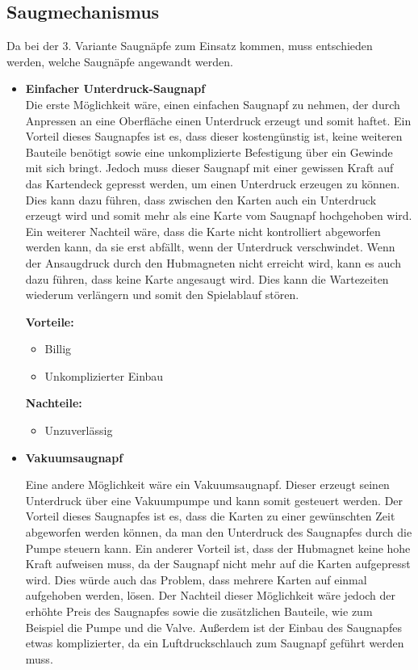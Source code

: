 \subsection{Saugmechanismus}

Da bei der 3. Variante Saugnäpfe zum Einsatz kommen, muss entschieden werden, welche Saugnäpfe angewandt werden.

\begin{itemize}
    \item \textbf{Einfacher Unterdruck-Saugnapf} \\
    Die erste Möglichkeit wäre, einen einfachen Saugnapf zu nehmen, der durch Anpressen an eine Oberfläche einen Unterdruck erzeugt und somit haftet.
    Ein Vorteil dieses Saugnapfes ist es, dass dieser kostengünstig ist, keine weiteren Bauteile benötigt sowie eine unkomplizierte Befestigung über ein Gewinde mit sich bringt.
    Jedoch muss dieser Saugnapf mit einer gewissen Kraft auf das Kartendeck gepresst werden, um einen Unterdruck erzeugen zu können.
    Dies kann dazu führen, dass zwischen den Karten auch ein Unterdruck erzeugt wird und somit mehr als eine Karte vom Saugnapf hochgehoben wird.
    Ein weiterer Nachteil wäre, dass die Karte nicht kontrolliert abgeworfen werden kann, da sie erst abfällt, wenn der Unterdruck verschwindet.
    Wenn der Ansaugdruck durch den Hubmagneten nicht erreicht wird, kann es auch dazu führen, dass keine Karte angesaugt wird.
    Dies kann die Wartezeiten wiederum verlängern und somit den Spielablauf stören.

    \textbf{Vorteile:}
    \begin{itemize}
        \item Billig
        \item Unkomplizierter Einbau
    \end{itemize}
    \textbf{Nachteile:}
    \begin{itemize}
        \item Unzuverlässig
    \end{itemize}

    \item \textbf{Vakuumsaugnapf}

    Eine andere Möglichkeit wäre ein Vakuumsaugnapf.
    Dieser erzeugt seinen Unterdruck über eine Vakuumpumpe und kann somit gesteuert werden.
    Der Vorteil dieses Saugnapfes ist es, dass die Karten zu einer gewünschten Zeit abgeworfen werden können, da man den Unterdruck des Saugnapfes durch die Pumpe steuern kann.
    Ein anderer Vorteil ist, dass der Hubmagnet keine hohe Kraft aufweisen muss, da der Saugnapf nicht mehr auf die Karten aufgepresst wird.
    Dies würde auch das Problem, dass mehrere Karten auf einmal aufgehoben werden, lösen.
    Der Nachteil dieser Möglichkeit wäre jedoch der erhöhte Preis des Saugnapfes sowie die zusätzlichen Bauteile, wie zum Beispiel die Pumpe und die Valve.
    Außerdem ist der Einbau des Saugnapfes etwas komplizierter, da ein Luftdruckschlauch
    zum Saugnapf geführt werden muss.


\end{itemize}
